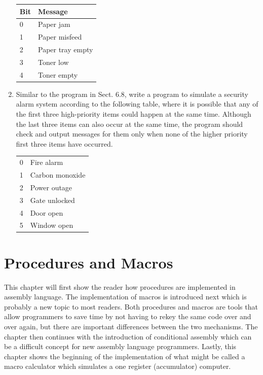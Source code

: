 \documentclass[10pt]{book}
\begin{document}
\begin{enumerate}
    \begin{tabular}{ll}
    \hline
    Bit & Message \\
    \hline
    0 & Paper jam \\
    1 & Paper misfeed \\
    2 & Paper tray empty \\
    3 & Toner low \\
    4 & Toner empty \\
    \hline
    \end{tabular}

  \item Similar to the program in Sect. 6.8, write a program to simulate a security alarm system according to the following table, where it is possible that any of the first three high-priority items could happen at the same time. Although the last three items can also occur at the same time, the program should check and output messages for them only when none of the higher priority first three items have occurred.

    \begin{tabular}{ll}
    \hline
    0 & Fire alarm \\
    1 & Carbon monoxide \\
    2 & Power outage \\
    3 & Gate unlocked \\
    4 & Door open \\
    5 & Window open \\
    \hline
    \end{tabular}
\end{enumerate}

\section{Procedures and Macros}
This chapter will first show the reader how procedures are implemented in assembly language. The implementation of macros is introduced next which is probably a new topic to most readers. Both procedures and macros are tools that allow programmers to save time by not having to rekey the same code over and over again, but there are important differences between the two mechanisms. The chapter then continues with the introduction of conditional assembly which can be a difficult concept for new assembly language programmers. Lastly, this chapter shows the beginning of the implementation of what might be called a macro calculator which simulates a one register (accumulator) computer.
\end{document}
